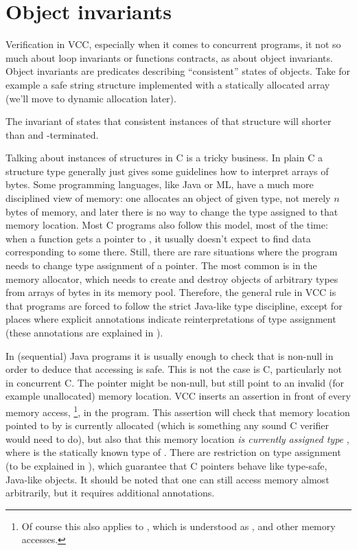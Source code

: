 \section{Object invariants}

Verification in VCC, especially when it comes to concurrent programs,
it not so much about loop invariants or functions contracts,
as about object invariants.
Object invariants are predicates describing ``consistent'' states of objects.
Take for example a safe string structure implemented with a
statically allocated array (we'll move to dynamic allocation later).


\noindent
The invariant of  states that consistent instances
of that structure will shorter than  and -terminated.

Talking about instances of structures in C is a tricky business. 
In plain C a structure type generally just gives some guidelines how to interpret
arrays of bytes.
Some programming languages, like Java or ML, have a much more disciplined
view of memory:
one allocates an object of given type, not merely $n$ bytes of memory,
and later there is no way to change the type assigned to that memory location.
Most C programs also follow this model, most of the time:
when a function gets a pointer to , it usually doesn't
expect to find data corresponding to some  there.
Still, there are rare situations where the program needs to
change type assignment of a pointer.
The most common is in the memory allocator, which needs to create
and destroy objects of arbitrary types from arrays of bytes
in its memory pool.
Therefore, the general rule in VCC is that programs are forced to
follow the strict Java-like type discipline, except for places
where explicit annotations indicate reinterpretations of type assignment
(these annotations are explained in ).

In (sequential) Java programs it is usually enough to check that
 is non-null in order to deduce that accessing  is safe.
This is not the case is C, particularly not in concurrent C.
The pointer  might be non-null, but still point to an invalid
(for example unallocated) memory location.
VCC inserts an assertion in front of every memory access,
%
\footnote{
  Of course this also applies to , which is understood
  as , and other memory accesses.
}, in the program. 
This assertion will check that memory location pointed to by 
is currently allocated (which is something any sound C verifier
would need to do), but also that this memory location 
\emph{is currently assigned type} , where  is the
statically known type of .
There are restriction on type assignment (to be explained in ), which guarantee
that C pointers behave like type-safe, Java-like objects.
It should be noted that one can still access memory almost arbitrarily,
but it requires additional annotations.

